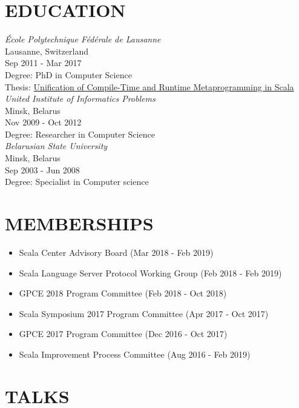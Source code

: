 \documentclass[margin, 10pt]{Stylesheet}
\begin{document}
\begin{resume}
\section{EDUCATION}

\emph{\'{E}cole Polytechnique F\'{e}d\'{e}rale de Lausanne} \\
Lausanne, Switzerland \\
Sep 2011 - Mar 2017 \\
Degree: PhD in Computer Science \\
Thesis: \href{https://infoscience.epfl.ch/record/226166}{Unification of Compile-Time and Runtime Metaprogramming in Scala} \\

\emph{United Institute of Informatics Problems} \\
Minsk, Belarus \\
Nov 2009 - Oct 2012 \\
Degree: Researcher in Computer Science \\

\emph{Belarusian State University} \\
Minsk, Belarus \\
Sep 2003 - Jun 2008 \\
Degree: Specialist in Computer science \\

\section{MEMBERSHIPS}

\begin{itemize} \itemsep -2pt
\item Scala Center Advisory Board (Mar 2018 - Feb 2019)
\item Scala Language Server Protocol Working Group (Feb 2018 - Feb 2019)
\item GPCE 2018 Program Committee (Feb 2018 - Oct 2018)
\item Scala Symposium 2017 Program Committee (Apr 2017 - Oct 2017)
\item GPCE 2017 Program Committee (Dec 2016 - Oct 2017)
\item Scala Improvement Process Committee (Aug 2016 - Feb 2019)
\end{itemize}

\section{TALKS}


\end{resume}
\end{document}
